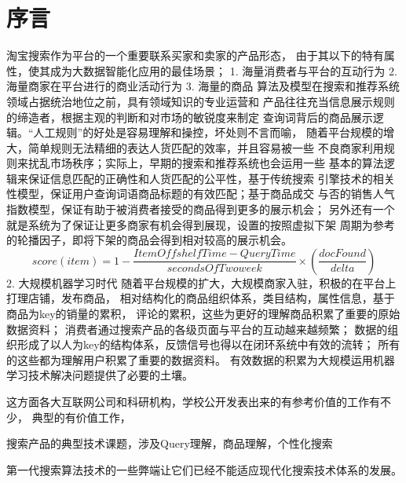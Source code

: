 
\chapter{序言}
\thispagestyle{empty}

\setlength{\fboxrule}{0pt}\setlength{\fboxsep}{0cm}
\noindent\shadowbox{
\begin{tcolorbox}[arc=0mm,colback=lightblue,colframe=darkblue,title=学习目标与要求]

\end{tcolorbox}}
\setlength{\fboxrule}{1pt}\setlength{\fboxsep}{4pt}

淘宝搜索作为平台的一个重要联系买家和卖家的产品形态， 
由于其以下的特有属性，使其成为大数据智能化应用的最佳场景；
1. 海量消费者与平台的互动行为
2. 海量商家在平台进行的商业活动行为
3. 海量的商品
算法及模型在搜索和推荐系统领域占据统治地位之前，具有领域知识的专业运营和
产品往往充当信息展示规则的缔造者，根据主观的判断和对市场的敏锐度来制定
查询词背后的商品展示逻辑。“人工规则”的好处是容易理解和操控，坏处则不言而喻，
随着平台规模的增大，简单规则无法精细的表达人货匹配的效率，并且容易被一些
不良商家利用规则来扰乱市场秩序；实际上，早期的搜索和推荐系统也会运用一些
基本的算法逻辑来保证信息匹配的正确性和人货匹配的公平性，基于传统搜索
引擎技术的相关性模型，保证用户查询词语商品标题的有效匹配；基于商品成交
与否的销售人气指数模型，保证有助于被消费者接受的商品得到更多的展示机会；
另外还有一个就是系统为了保证让更多商家有机会得到展现，设置的按照虚拟下架
周期为参考的轮播因子，即将下架的商品会得到相对较高的展示机会。
$$
	score(item)=1-\frac{ItemOffshelfTime-QueryTime}{secondsOfTwoweek}\times(\frac{docFound}{delta})
$$
2. 大规模机器学习时代
随着平台规模的扩大，大规模商家入驻，积极的在平台上打理店铺，发布商品，
相对结构化的商品组织体系，类目结构，属性信息，基于商品为key的销量的累积，
评论的累积，这些为更好的理解商品积累了重要的原始数据资料；
消费者通过搜索产品的各级页面与平台的互动越来越频繁；
数据的组织形成了以人为key的结构体系，反馈信号也得以在闭环系统中有效的流转；
所有的这些都为理解用户积累了重要的数据资料。
有效数据的积累为大规模运用机器学习技术解决问题提供了必要的土壤。

这方面各大互联网公司和科研机构，学校公开发表出来的有参考价值的工作有不少，
典型的有价值工作，



搜索产品的典型技术课题，涉及Query理解，商品理解，个性化搜索

第一代搜索算法技术的一些弊端让它们已经不能适应现代化搜索技术体系的发展。


